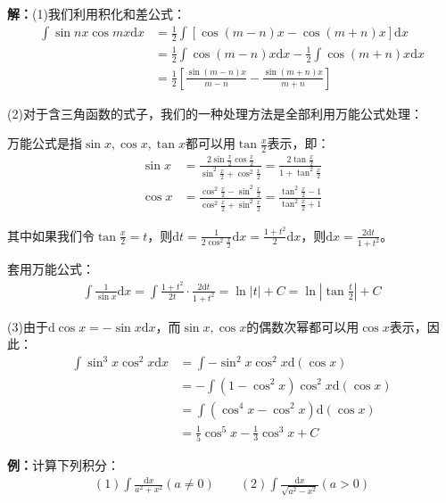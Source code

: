 \documentclass{ctexart}
\let\oldtextbf\textbf %
\renewcommand{\textbf}[1]{\textcolor{btex}{\oldtextbf{#1}}} %
\begin{document}
\textbf{解：}(1)我们利用积化和差公式：
\begin{align*}
    \int\sin nx\cos mx\mathrm{d}x&=\frac{1}{2}\int[\cos(m-n)x-\cos(m+n)x]\mathrm{d}x\\
    &=\frac{1}{2}\int \cos (m-n)x\mathrm{d}x-\frac{1}{2}\int \cos(m+n)x\mathrm{d}x\\
    &=\frac{1}{2}[\frac{\sin (m-n)x}{m-n}-\frac{\sin (m+n)x}{m+n}]
\end{align*}

(2)对于含三角函数的式子，我们的一种处理方法是全部利用万能公式处理：
\begin{tcolorbox}[
    colback=bac2,     %
    colframe=fra2,   %
    coltitle=white,             %
    coltext=tex2,
    title=万能公式和不定积分的关系,
    fonttitle=\bfseries,        %
arc=3mm,                     %
breakable
]
万能公式是指$\sin x,\cos x,\tan x$都可以用$\tan\frac{x}{2}$表示，即：
\begin{align*}
    \sin x&=\frac{2\sin\frac{x}{2}\cos\frac{x}{2}}{\sin^2\frac{x}{2}+\cos^2\frac{x}{2}}=\frac{2\tan\frac{x}{2}}{1+\tan^2\frac{x}{2}}\\
    \cos x&=\frac{\cos^2\frac{x}{2}-\sin^2\frac{x}{2}}{\cos^2\frac{x}{2}+\sin^2\frac{x}{2}}=\frac{\tan^2\frac{x}{2}-1}{\tan^2\frac{x}{2}+1}\tag{4-5}
\end{align*}

其中如果我们令$\tan\frac{x}{2}=t$，则$\mathrm{d}t=\frac{1}{2\cos^2\frac{x}{2}}\mathrm{d}x=\frac{1+t^2}{2}\mathrm{d}x$，则$\mathrm{d}x=\frac{2\mathrm{d}t}{1+t^2}$。
\end{tcolorbox}

套用万能公式：
\begin{align*}
    \int\frac{1}{\sin x}\mathrm{d}x=\int \frac{1+t^2}{2t}\cdot\frac{2\mathrm{d}t}{1+t^2}=\ln |t|+C=\ln|\tan\frac{t}{2}|+C
\end{align*}

(3)由于$\mathrm{d}\cos x=-\sin x\mathrm{d}x$，而$\sin x,\cos x$的偶数次幂都可以用$\cos x$表示，因此：
\begin{align*}
   \int \sin^3x\cos^2x\mathrm{d}x&=\int -\sin^2 x\cos^2 x\mathrm{d}(\cos x)\\
   &=-\int (1-\cos ^2x)\cos^2 x\mathrm{d}(\cos x)\\
   &=\int(\cos^4 x-\cos ^2 x)\mathrm{d}(\cos x)\\
   &=\frac{1}{5}\cos^5 x-\frac{1}{3}\cos^3 x+C
\end{align*}

\textbf{例：}计算下列积分：
\begin{align*}
    (1)\int\frac{\mathrm{d}x}{a^2+x^2}(a\neq 0)\qquad (2)\int\frac{\mathrm{d}x}{\sqrt{a^2-x^2}}(a>0)
\end{align*}
\end{document}
